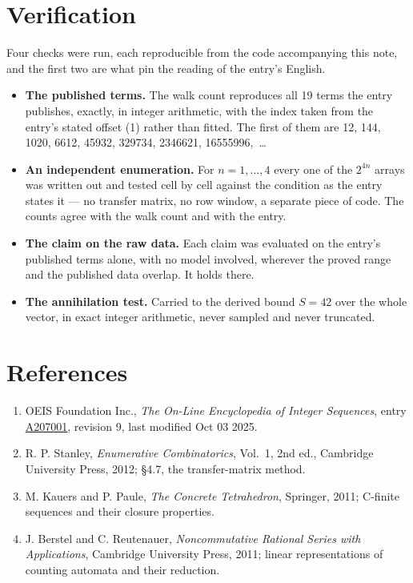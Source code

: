 \documentclass[11pt]{article}
\theoremstyle{definition}
\begin{document}
\section{Verification}

Four checks were run, each reproducible from the code accompanying this note, and the first two are what pin the reading of the entry's English.

\begin{itemize}

\item {\bfseries The published terms.} The walk count reproduces all 19 terms the entry publishes, exactly, in integer arithmetic, with the index taken from the entry's stated offset (1) rather than fitted. The first of them are 12, 144, 1020, 6612, 45932, 329734, 2346621, 16555996,~\dots

\item {\bfseries An independent enumeration.} For $n = 1,\dots,4$ every one of the $2^{4n}$ arrays was written out and tested cell by cell against the condition as the entry states it --- no transfer matrix, no row window, a separate piece of code. The counts agree with the walk count and with the entry.

\item {\bfseries The claim on the raw data.} Each claim was evaluated on the entry's published terms alone, with no model involved, wherever the proved range and the published data overlap. It holds there.

\item {\bfseries The annihilation test.} Carried to the derived bound $S = 42$ over the whole vector, in exact integer arithmetic, never sampled and never truncated.

\end{itemize}

\section{References}

\begin{enumerate}

\item OEIS Foundation Inc., \emph{The On-Line Encyclopedia of Integer Sequences}, entry \href{https://oeis.org/A207001}{A207001}, revision 9, last modified Oct 03 2025.

\item R. P. Stanley, \emph{Enumerative Combinatorics}, Vol.~1, 2nd ed., Cambridge University Press, 2012; \S4.7, the transfer-matrix method.

\item M. Kauers and P. Paule, \emph{The Concrete Tetrahedron}, Springer, 2011; C-finite sequences and their closure properties.

\item J. Berstel and C. Reutenauer, \emph{Noncommutative Rational Series with Applications}, Cambridge University Press, 2011; linear representations of counting automata and their reduction.

\end{enumerate}
\end{document}

